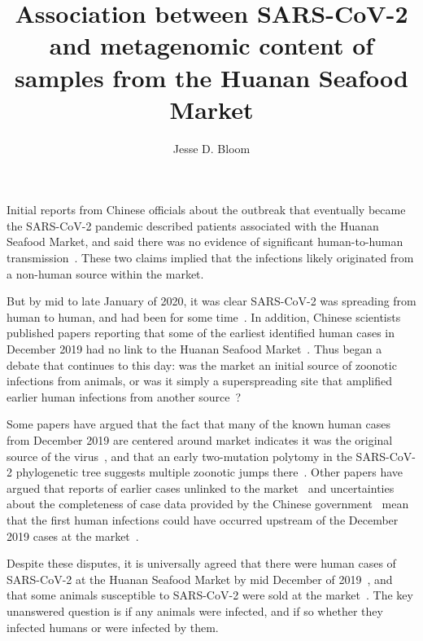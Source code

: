 \documentclass[9pt,twocolumn,twoside]{gsajnl_modified}
\title{Association between SARS-CoV-2 and metagenomic content of samples from the Huanan Seafood Market}
\author[]{\Large Jesse D. Bloom}
\affil[]{Fred Hutchinson Cancer Center; Howard Hughes Medical Institute

}
\begin{document}
\maketitle
\thispagestyle{firststyle}
\firstpagefootnote

\vspace{-33pt}%

\lettrine[lines=2]{\color{color2}I}{}nitial reports from Chinese officials about the outbreak that eventually became the SARS-CoV-2 pandemic described patients associated with the Huanan Seafood Market, and said there was no evidence of significant human-to-human transmission~\citep{ProMED2109, healthcommission2019, healthcommission2020, who2020}.
These two claims implied that the infections likely originated from a non-human source within the market.

But by mid to late January of 2020, it was clear SARS-CoV-2 was spreading from human to human, and had been for some time~\citep{chan2020familial,phan2020importation,li2020early,nishiura2020initial}.
In addition, Chinese scientists published papers reporting that some of the earliest identified human cases in December 2019 had no link to the Huanan Seafood Market~\citep{huang2020clinical,chen2020epidemiological,zhang2020viral}.
Thus began a debate that continues to this day: was the market an initial source of zoonotic infections from animals, or was it simply a superspreading site that amplified earlier human infections from another source~\citep{cohen2020wuhan}?

Some papers have argued that the fact that many of the known human cases from December 2019 are centered around market indicates it was the original source of the virus~\citep{worobey2022huanan}, and that an early two-mutation polytomy in the SARS-CoV-2 phylogenetic tree suggests multiple zoonotic jumps there~\citep{pekar2022molecular}.
Other papers have argued that reports of earlier cases unlinked to the market~\citep{huang2020clinical,chen2020epidemiological,zhang2020viral,ma2020SCMP} and uncertainties about the completeness of case data provided by the Chinese government~\citep{cohen2022anywhere,hvistendahl2023} mean that the first human infections could have occurred upstream of the December 2019 cases at the market~\citep{pekar2021timing,pipes2021assessing,bloom2021recovery}.

Despite these disputes, it is universally agreed that there were human cases of SARS-CoV-2 at the Huanan Seafood Market by mid December of 2019~\citep{li2020early}, and that some animals susceptible to SARS-CoV-2 were sold at the market~\citep{xiao2021animal}.
The key unanswered question is if any animals were infected, and if so whether they infected humans or were infected by them.
\end{document}
